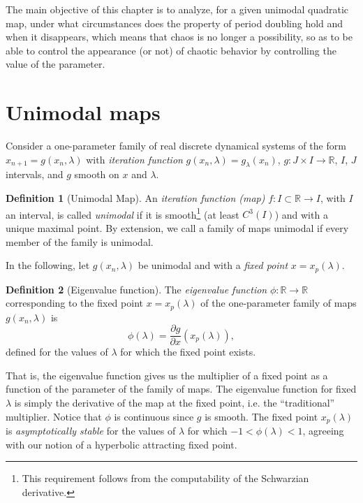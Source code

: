 \documentclass[10pt,twoside,titlepage]{book}
\numberwithin{equation}{chapter}
\numberwithin{figure}{chapter}
\numberwithin{table}{chapter}
\theoremstyle{plain}%
\theoremstyle{definition}
\newtheorem{defn}{Definition}[chapter]
\theoremstyle{remark}
\begin{document}
The main objective of this chapter is to analyze, for a given unimodal quadratic map, under what circumstances does the property of period doubling hold and when it disappears, which means that chaos is no longer a possibility, so as to be able to control the appearance (or not) of chaotic behavior by controlling the value of the parameter.

\section{Unimodal maps}

Consider a one-parameter family of real discrete dynamical systems of the form $x_{n+1}=g(x_{n},\lambda)$ with \emph{iteration function} $g(x_{n},\lambda)=g_{\lambda}(x_{n})$, $g:J\times I\rightarrow\mathbb{R}$, $I$, $J$ intervals, and $g$ smooth on $x$ and $\lambda$.

\begin{defn}[Unimodal Map]
	An \emph{iteration function (map)} $f:I\subset\mathbb{R}\rightarrow I$, with $I$ an interval, is called \emph{unimodal} if it is smooth\footnote{This requirement follows from the computability of the Schwarzian derivative.} (at least $C^{3}(I)$) and with a unique maximal point. By extension, we call a family of maps unimodal if every member of the family is unimodal.
\end{defn}

In the following, let $g(x_{n},\lambda)$ be unimodal and with a \emph{fixed point} $x=x_{p}(\lambda)$.

\begin{defn}[Eigenvalue function]
	\label{def:eigfunction}
	The \emph{eigenvalue function} $\phi:\mathbb{R}\rightarrow\mathbb{R}$ corresponding to the fixed point $x=x_{p}(\lambda)$ of the one-parameter family of maps $g(x_{n},\lambda)$ is
	\begin{equation}
		\label{eq:EigenvalueFunction}
		\phi(\lambda)=\frac{\partial g}{\partial x}(x_{p}(\lambda)),
	\end{equation}
	defined for the values of $\lambda$ for which the fixed point exists.
\end{defn}

That is, the eigenvalue function gives us the multiplier of a fixed point as a function of the parameter of the family of maps. The eigenvalue function for fixed $\lambda$ is simply the derivative of the map at the fixed point, i.e. the ``traditional'' multiplier. Notice that $\phi$ is continuous since $g$ is smooth. The fixed point $x_{p}(\lambda)$ is \emph{asymptotically stable} for the values of $\lambda$ for which $-1<\phi(\lambda)<1$, agreeing with our notion of a hyperbolic attracting fixed point.
\end{document}
